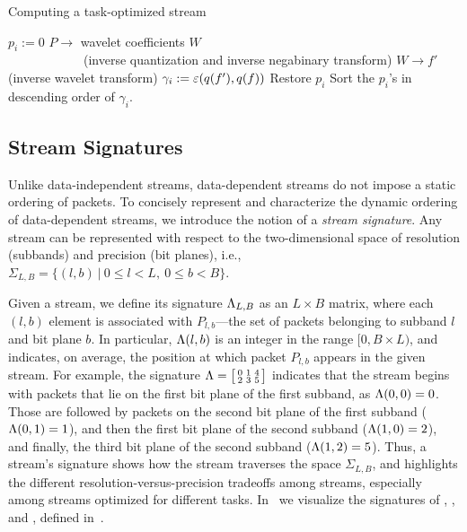\begin{algorithm}[h]
  \caption{Computing a task-optimized stream}
  \begin{algorithmic}[1]
			\State $p_i := 0$
      \State $P \rightarrow$ wavelet coefficients $W$ \\
      		\ \ \ \ \ \ \ \ \ \ \ \ (inverse quantization and inverse negabinary transform)
			\State $W \rightarrow f'$ (inverse wavelet transform)
			\State $\gamma_i := \err(q(f'),q(f))$			
			\State Restore $p_i$
		\EndFor
		\State Sort the $p_i$'s in descending order of $\gamma_i$.
	\end{algorithmic}
	\label{alg:greedy}
\end{algorithm}

\subsection{Stream Signatures} \label{sec:stream-signature}
Unlike data-independent streams, data-dependent streams do not impose a static ordering of packets.
To concisely represent and characterize the dynamic ordering of data-dependent streams, we introduce
the notion of a \emph{stream signature}. Any stream can be represented with respect to the
two-dimensional space of resolution (subbands) and precision (bit planes), i.e., \mbox{$
\Sigma_{L,B}=\{(l,b)\ |\ 0\leq l < L,\ 0\leq b < B\}$.}

Given a stream, we define its signature $\sgn_{L,B}$ as an $L \times B$ matrix, where each $(l,b)$
element is associated with $P_{l,b}$---the set of packets belonging to subband $l$ and bit plane
$b$. In particular, $\sgn(l,b)$ is an integer in the range $[0, B\times L)$, and indicates, on
average, the position at which packet $P_{l,b}$ appears in the given stream. For example, the
signature $\sgn=\bigl[ \begin{smallmatrix}0 & 1 & 4\\ 2 & 3 & 5\end{smallmatrix}\bigr]$ indicates
that the stream begins with packets that lie on the first bit plane of the first subband, as
$\sgn(0,0)=0$. Those are followed by packets on the second bit plane of the first subband
($\sgn(0,1)=1$), and then the first bit plane of the second subband ($\sgn(1,0)=2$), and finally,
the third bit plane of the second subband ($\sgn(1,2)=5$). Thus, a stream's signature shows how the
stream traverses the space $\Sigma_{L,B}$, and highlights the different resolution-versus-precision
tradeoffs among streams, especially among \sopt streams optimized for different tasks.
In~ we visualize the signatures of \sbit, \slvl, and \swav, defined
in~.

